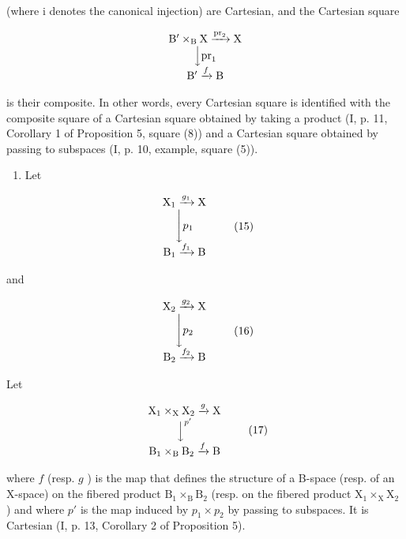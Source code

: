 (where i denotes the canonical injection) are Cartesian, and the Cartesian square

\[
\begin{array}{c} \mathrm{B} ^ {\prime} \times_ {\mathrm{B}} \mathrm{X} \xrightarrow {\mathrm{pr} _ {2}} \mathrm{X} \\ \Big \downarrow \mathrm{pr} _ {1} \\ \mathrm{B} ^ {\prime} \xrightarrow {f} \mathrm{B} \end{array}
\]

is their composite. In other words, every Cartesian square is identified with the composite square of a Cartesian square obtained by taking a product (I, p. 11, Corollary 1 of Proposition 5, square (8)) and a Cartesian square obtained by passing to subspaces (I, p. 10, example, square (5)).

\begin{enumerate}
\def\labelenumi{\arabic{enumi})}
\setcounter{enumi}{2}
\tightlist
\item
  Let
\end{enumerate}

\[
\begin{array}{c} \mathrm{X} _ {1} \xrightarrow {g _ {1}} \mathrm{X} \\ \Biggl \downarrow p _ {1} \\ \mathrm{B} _ {1} \xrightarrow {f _ {1}} \mathrm{B} \end{array}\tag{15}
\]

and

\[
\begin{array}{c} \mathrm{X} _ {2} \xrightarrow {g _ {2}} \mathrm{X} \\ \Biggl \downarrow p _ {2} \\ \mathrm{B} _ {2} \xrightarrow {f _ {2}} \mathrm{B} \end{array}\tag{16}
\]

  Let

\[
\begin{array}{c} \mathrm{X} _ {1} \times_ {\mathrm{X}} \mathrm{X} _ {2} \xrightarrow {g} \mathrm{X} \\ \Big \downarrow^ {p ^ {\prime}} \\ \mathrm{B} _ {1} \times_ {\mathrm{B}} \mathrm{B} _ {2} \xrightarrow {f} \mathrm{B} \end{array}\tag{17}
\]

where \(f\) (resp. \(g\) ) is the map that defines the structure of a B-space (resp. of an X-space) on the fibered product \(\mathrm{B}_{1} \times_{\mathrm{B}} \mathrm{B}_{2}\) (resp. on the fibered product \(\mathrm{X}_{1} \times_{\mathrm{X}} \mathrm{X}_{2}\) ) and where \(p'\) is the map induced by \(p_{1} \times p_{2}\) by passing to subspaces. It is Cartesian (I, p. 13, Corollary 2 of Proposition 5).

